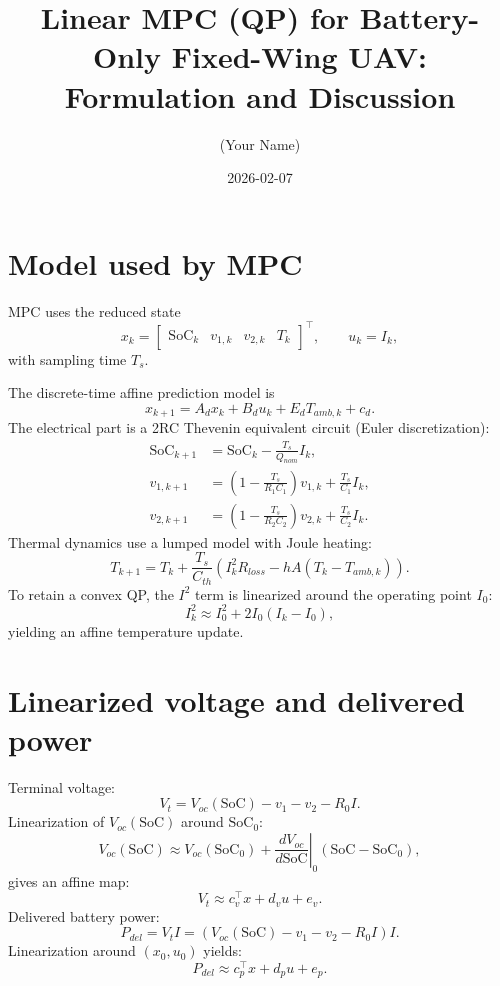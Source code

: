 \documentclass[10pt]{article}
\title{Linear MPC (QP) for Battery-Only Fixed-Wing UAV: Formulation and Discussion}
\author{(Your Name)}
\date{2026-02-07}
\begin{document}
\maketitle

\section{Model used by MPC}
MPC uses the reduced state
\[
x_k = \begin{bmatrix}\mathrm{SoC}_k & v_{1,k} & v_{2,k} & T_k\end{bmatrix}^\top,\qquad u_k = I_k,
\]
with sampling time $T_s$.

The discrete-time affine prediction model is
\[
x_{k+1} = A_d x_k + B_d u_k + E_d T_{amb,k} + c_d.
\]
The electrical part is a 2RC Thevenin equivalent circuit (Euler discretization):
\begin{align}
\mathrm{SoC}_{k+1} &= \mathrm{SoC}_k - \frac{T_s}{Q_{nom}} I_k,\\
v_{1,k+1} &= \left(1-\frac{T_s}{R_1 C_1}\right) v_{1,k} + \frac{T_s}{C_1} I_k,\\
v_{2,k+1} &= \left(1-\frac{T_s}{R_2 C_2}\right) v_{2,k} + \frac{T_s}{C_2} I_k.
\end{align}
Thermal dynamics use a lumped model with Joule heating:
\[
T_{k+1} = T_k + \frac{T_s}{C_{th}}\left(I_k^2 R_{loss} - hA(T_k-T_{amb,k})\right).
\]
To retain a convex QP, the $I^2$ term is linearized around the operating point $I_0$:
\[
I_k^2 \approx I_0^2 + 2I_0(I_k-I_0),
\]
yielding an affine temperature update.

\section{Linearized voltage and delivered power}
Terminal voltage:
\[
V_t = V_{oc}(\mathrm{SoC}) - v_1 - v_2 - R_0 I.
\]
Linearization of $V_{oc}(\mathrm{SoC})$ around $\mathrm{SoC}_0$:
\[
V_{oc}(\mathrm{SoC}) \approx V_{oc}(\mathrm{SoC}_0) + \left.\frac{dV_{oc}}{d\mathrm{SoC}}\right|_0 (\mathrm{SoC}-\mathrm{SoC}_0),
\]
gives an affine map:
\[
V_t \approx c_v^\top x + d_v u + e_v.
\]
Delivered battery power:
\[
P_{del} = V_t I = (V_{oc}(\mathrm{SoC})-v_1-v_2-R_0 I)I.
\]
Linearization around $(x_0,u_0)$ yields:
\[
P_{del} \approx c_p^\top x + d_p u + e_p.
\]
\end{document}
